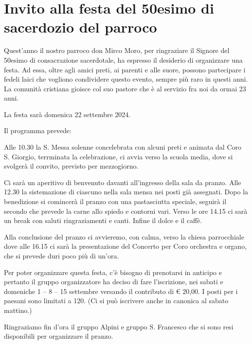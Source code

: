 \section{Invito alla festa del 50esimo di sacerdozio del parroco}

Quest’anno il nostro parroco don Mirco Moro, per ringraziare il Signore del 50esimo di consacrazione sacerdotale, ha espresso il desiderio di organizzare una festa. Ad essa, oltre agli amici preti, ai parenti e alle suore, possono partecipare i fedeli laici che vogliono condividere questo evento, sempre più raro in questi anni. La comunità cristiana gioisce col suo pastore che è al servizio fra noi da ormai 23 anni.

La festa sarà
{\Large domenica 22 settembre 2024}.

Il programma prevede:

Alle 10.30 la S. Messa solenne concelebrata con alcuni preti e animata dal Coro S. Giorgio, terrminata la celebrazione, ci avvia verso la scuola media, dove si svolgerà il convito, previsto per mezzogiorno.

Ci sarà un aperitivo di benvenuto davanti all’ingresso della sala da pranzo. Alle 12.30 la sistemazione di ciascuno nella sala mensa nei posti già assegnati. Dopo la benedizione si comincerà il pranzo con una pastasciutta speciale, seguirà il secondo che prevede la carne allo spiedo e contorni vari.
Verso le ore 14.15 ci sarà un break con saluti ringraziamenti e canti. Infine il dolce e il caffè.

Alla conclusione del pranzo ci avvieremo, con calma, verso la chiesa parrocchiale dove alle 16.15 ci sarà la presentazione del Concerto per Coro orchestra e organo, che si prevede duri poco più di un'ora.

Per poter organizzare questa festa, c’è bisogno di prenotarsi in anticipo e pertanto il gruppo organizzatore ha deciso di fare l’iscrizione, nei sabati e domeniche 1 -- 8 -- 15 settembre versando il contributo di € 20,00. I posti per i paesani sono limitati a 120. (Ci si può iscrivere anche in canonica al sabato mattino.)

Ringraziamo fin d’ora il gruppo Alpini e gruppo S. Francesco che si sono resi disponibili per organizzare il pranzo.



